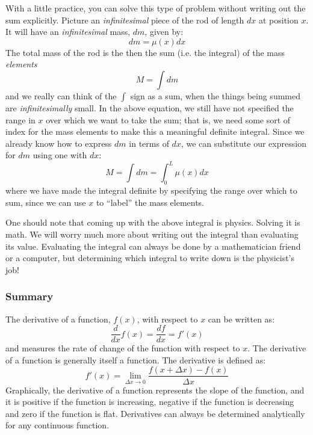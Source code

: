 With a little practice, you can solve this type of problem without writing out the sum explicitly. Picture an \textit{infinitesimal} piece of the rod of length $dx$ at position $x$. It will have an \textit{infinitesimal} mass, $dm$, given by:
\begin{equation}
dm = \mu(x) dx
\end{equation}
The total mass of the rod is the then the sum (i.e. the integral) of the mass \textit{elements}
\begin{equation}
M = \int dm
\end{equation}
and we really can think of the $\int$ sign as a sum, when the things being summed are \textit{infinitesimally} small. In the above equation, we still have not specified the range in $x$ over which we want to take the sum; that is, we need some sort of index for the mass elements to make this a meaningful definite integral. Since we already know how to express $dm$ in terms of $dx$, we can substitute our expression for $dm$ using one with $dx$:
\begin{equation}
M = \int dm = \int_0^L \mu(x) dx
\end{equation}
where we have made the integral definite by specifying the range over which to sum, since we can use $x$ to ``label'' the mass elements.

One should note that coming up with the above integral is physics. Solving it is math. We will worry much more about writing out the integral than evaluating its value. Evaluating the integral can always be done by a mathematician friend or a computer, but determining which integral to write down is the physicist's job!

\subsubsection{Summary}

The derivative of a function, $f(x)$, with respect to $x$ can be written as:
\begin{equation}
\frac{d}{dx} f(x)=\frac{df}{dx}=f'(x)
\end{equation}
and measures the rate of change of the function with respect to $x$. The derivative of a function is generally itself a function. The derivative is defined as:
\begin{equation}
f'(x) = \lim_{\Delta x \to 0}\frac{f(x+\Delta x)-f(x)}{\Delta x}
\end{equation}
Graphically, the derivative of a function represents the slope of the function, and it is positive if the function is increasing, negative if the function is decreasing and zero if the function is flat.  Derivatives can always be determined analytically for any continuous function.

